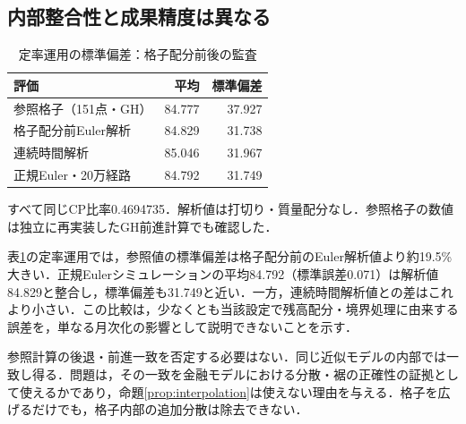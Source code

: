 \documentclass[11pt,a4paper]{article}
\numberwithin{equation}{section}
\numberwithin{table}{section}
\numberwithin{figure}{section}
\theoremstyle{plain}
\theoremstyle{definition}
\begin{document}
\subsection{内部整合性と成果精度は異なる}
\begin{table}[htbp]\centering\small
\caption{定率運用の標準偏差：格子配分前後の監査}\label{tab:cp-audit}
\begin{tabular}{lrr}
\toprule
評価 & 平均 & 標準偏差 \\ \midrule
参照格子（151点・GH） & 84.777 & 37.927 \\
格子配分前Euler解析 & 84.829 & 31.738 \\
連続時間解析 & 85.046 & 31.967 \\
正規Euler・20万経路 & 84.792 & 31.749 \\
\bottomrule\end{tabular}
\par\vspace{3pt}\begin{minipage}{0.97\textwidth}\footnotesize すべて同じCP比率0.4694735．解析値は打切り・質量配分なし．参照格子の数値は独立に再実装したGH前進計算でも確認した．\end{minipage}
\end{table}
表\ref{tab:cp-audit}の定率運用では，参照値の標準偏差は格子配分前のEuler解析値より約19.5\%大きい．正規Eulerシミュレーションの平均84.792（標準誤差0.071）は解析値84.829と整合し，標準偏差も31.749と近い．一方，連続時間解析値との差はこれより小さい．この比較は，少なくとも当該設定で残高配分・境界処理に由来する誤差を，単なる月次化の影響として説明できないことを示す．

参照計算の後退・前進一致を否定する必要はない．同じ近似モデルの内部では一致し得る．問題は，その一致を金融モデルにおける分散・裾の正確性の証拠として使えるかであり，命題\ref{prop:interpolation}は使えない理由を与える．格子を広げるだけでも，格子内部の追加分散は除去できない．
\end{document}
